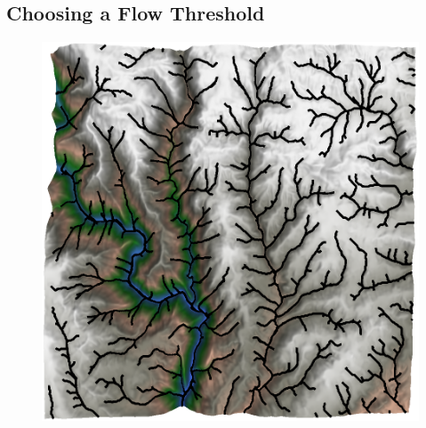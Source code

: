 \subsection{Choosing a Flow Threshold}
\label{section:ChoosingAFlowThreshold}


\begin{figure}[t]
\centering
\begin{minipage}[b]{0.45\linewidth}
\begin{center}
\includegraphics[width=\linewidth]{images/ChannelNetworkWithoutWeights_160_mtn3.png}
\end{center}
\end{minipage}
\begin{minipage}[b]{0.45\linewidth}
\begin{center}

\end{center}
\end{minipage}
\end{figure}
